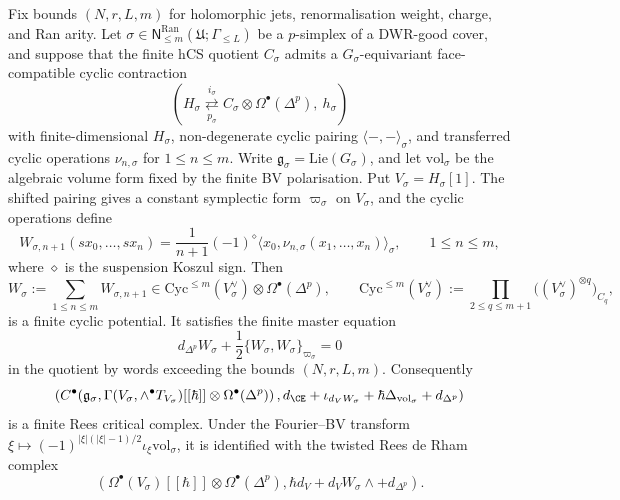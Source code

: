 \begin{proposition}
\label{prop:cycainf-finite-cyclic-potential-rees}
Fix bounds $(N,r,L,m)$ for holomorphic jets, renormalisation weight,
charge, and Ran arity. Let
$\sigma \in \mathsf N_{\leq m}^{\mathrm{Ran}}(\mathfrak U;\Gamma_{\leq L})$
be a $p$-simplex of a DWR-good cover, and suppose that the finite hCS
quotient $C_\sigma$ admits a $G_\sigma$-equivariant face-compatible
cyclic contraction
\[
 \left(
 H_\sigma
 \underset{p_\sigma}{\stackrel{i_\sigma}{\rightleftarrows}}
 C_\sigma\otimes\Omega^\bullet(\Delta^p),
 \ h_\sigma
 \right)
\]
with finite-dimensional $H_\sigma$, non-degenerate cyclic pairing
$\langle-,-\rangle_\sigma$, and transferred cyclic operations
$\nu_{n,\sigma}$ for $1\leq n\leq m$. Write
$\mathfrak g_\sigma=\mathrm{Lie}(G_\sigma)$, and let
$\mathrm{vol}_\sigma$ be the algebraic volume form fixed by the finite
BV polarisation. Put
$V_\sigma=H_\sigma[1]$. The shifted pairing gives a constant
symplectic form $\varpi_\sigma$ on $V_\sigma$, and the cyclic operations
define
\[
 W_{\sigma,n+1}(sx_0,\ldots,sx_n)
 =
 \frac{1}{n+1}(-1)^{\diamond}
 \langle x_0,\nu_{n,\sigma}(x_1,\ldots,x_n)\rangle_\sigma,
 \qquad
 1\leq n\leq m,
\]
where $\diamond$ is the suspension Koszul sign. Then
\[
 W_\sigma:=\sum_{1\leq n\leq m}W_{\sigma,n+1}
 \in
 \mathrm{Cyc}^{\leq m}(V_\sigma^\vee)\otimes
 \Omega^\bullet(\Delta^p),
 \qquad
 \mathrm{Cyc}^{\leq m}(V_\sigma^\vee)
 :=
 \prod_{2\leq q\leq m+1}
 \bigl((V_\sigma^\vee)^{\otimes q}\bigr)_{C_q},
\]
is a finite cyclic potential. It satisfies the finite master equation
\[
 d_{\Delta^p}W_\sigma+\frac{1}{2}\{W_\sigma,W_\sigma\}_{\varpi_\sigma}=0
\]
in the quotient by words exceeding the bounds $(N,r,L,m)$. Consequently
\[
 \left(
 C^\bullet\!\left(
 \mathfrak g_\sigma,
 \Gamma(V_\sigma,\wedge^\bullet T_{V_\sigma})[[\hbar]]
 \otimes\Omega^\bullet(\Delta^p)
 \right),
 d_{\CE}+\iota_{d_VW_\sigma}
 +\hbar\Delta_{\mathrm{vol}_\sigma}+d_{\Delta^p}
 \right)
\]
is a finite Rees critical complex. Under the Fourier--BV transform
$\xi\mapsto(-1)^{|\xi|(|\xi|-1)/2}\iota_\xi\mathrm{vol}_\sigma$, it is
identified with the twisted Rees de Rham complex
\[
 \left(
 \Omega^\bullet(V_\sigma)[[\hbar]]\otimes\Omega^\bullet(\Delta^p),
 \hbar d_V+d_VW_\sigma\wedge+d_{\Delta^p}
 \right).
\]


\end{proposition}
